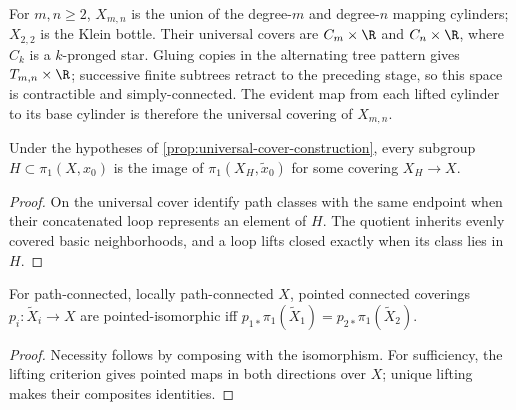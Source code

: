 \begin{example}
\label{ex:xmn-universal-cover-construction}
For $m,n\geq2$, $X_{m,n}$ is the union of the degree-$m$ and degree-$n$
mapping cylinders; $X_{2,2}$ is the Klein bottle. Their universal covers are
$C_m\times\R$ and $C_n\times\R$, where $C_k$ is a $k$-pronged star. Gluing
copies in the alternating tree pattern gives $T_{m,n}\times\R$; successive
finite subtrees retract to the preceding stage, so this space is contractible
and simply-connected. The evident map from each lifted cylinder to its base
cylinder is therefore the universal covering of $X_{m,n}$.
\end{example}

\begin{proposition}
\label{prop:covering-space-existence-for-subgroup}
\leanok
{}
Under the hypotheses of \cref{prop:universal-cover-construction}, every
subgroup $H\subset\pi_1(X,x_0)$ is the image of $\pi_1(X_H,\widetilde x_0)$
for some covering $X_H\to X$.
\end{proposition}

\begin{proof}
\leanok
\sketch On the universal cover identify path classes with the same endpoint
when their concatenated loop represents an element of $H$. The quotient
inherits evenly covered basic neighborhoods, and a loop lifts closed exactly
when its class lies in $H$.
\end{proof}

\begin{proposition}
\label{prop:covering-space-isomorphism-criterion}
\leanok
{}
For path-connected, locally path-connected $X$, pointed connected coverings
$p_i:\widetilde X_i\to X$ are pointed-isomorphic iff
$p_{1*}\pi_1(\widetilde X_1)=p_{2*}\pi_1(\widetilde X_2)$.
\end{proposition}

\begin{proof}
\leanok
\sketch Necessity follows by composing with the isomorphism. For sufficiency,
the lifting criterion gives pointed maps in both directions over $X$; unique
lifting makes their composites identities.
\end{proof}

